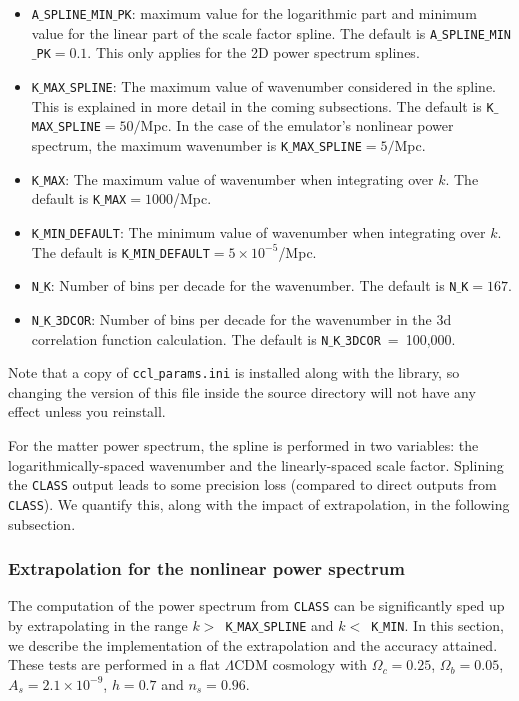 \documentclass[\docopts]{\docclass}
\begin{document}
\begin{itemize}
\item {\tt A$\_$SPLINE$\_$MIN$\_$PK}: maximum value for the logarithmic part and minimum value for the linear part of the scale factor spline. The default is {\tt A$\_$SPLINE$\_$MIN$\_$PK}$=0.1$. This only applies for the 2D power spectrum splines.
\item {\tt K$\_$MAX$\_$SPLINE}: The maximum value of wavenumber considered in the spline. This is explained in more detail in the coming subsections. The default is {\tt K$\_$MAX$\_$SPLINE}$=50/$Mpc. In the case of the emulator's nonlinear power spectrum, the maximum wavenumber is {\tt K$\_$MAX$\_$SPLINE}$=5/$Mpc.
\item {\tt K$\_$MAX}: The maximum value of wavenumber when integrating over $k$. The default is {\tt K$\_$MAX}$=1000$/Mpc.
\item {\tt K$\_$MIN$\_$DEFAULT}:  The minimum value of wavenumber when integrating over $k$. The default is {\tt K$\_$MIN$\_$DEFAULT}$=5 \times 10^{-5}$/Mpc.
\item {\tt N$\_$K}: Number of bins per decade for the wavenumber. The default is {\tt N$\_$K}$=167$.
\item {\tt N$\_$K$\_$3DCOR}: Number of bins per decade for the wavenumber in the 3d correlation function calculation. 
The default is {\tt N$\_$K$\_$3DCOR}~=~100,000.
\end{itemize}
Note that a copy of {\tt ccl$\_$params.ini} is installed along with the library, so changing the version of this file inside the source directory will not have any effect unless you reinstall.

For the matter power spectrum, the spline is performed in two variables: the logarithmically-spaced wavenumber and the linearly-spaced scale factor. Splining the {\tt CLASS} output leads to some precision loss (compared to direct outputs from {\tt CLASS}). We quantify this, along with the impact of extrapolation, in the following subsection.

\subsubsection{Extrapolation for the nonlinear power spectrum}
\label{sec:NLextrapol}

The computation of the power spectrum from {\tt CLASS} can be significantly sped up by extrapolating in the range $k>$~{\tt K$\_$MAX$\_$SPLINE} and $k<$~{\tt K$\_$MIN}. In this section, we describe the implementation of the extrapolation and the accuracy attained. These tests are performed in a flat $\Lambda$CDM cosmology with $\Omega_c=0.25$, $\Omega_b=0.05$, $A_s=2.1\times10^{-9}$, $h=0.7$ and $n_s=0.96$.
\end{document}
